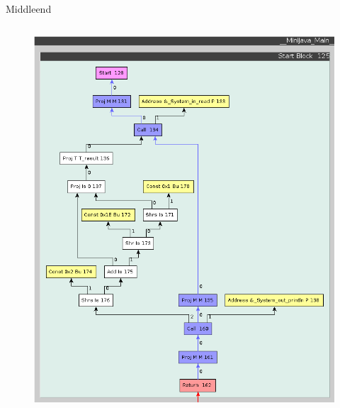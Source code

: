 \documentclass[en,16:9]{sdqbeamer}
\begin{document}
\begin{frame}{Middleend}
\begin{columns}
		\begin{column}{0.3\linewidth}
			\begin{figure}
				\centering
				\includegraphics[scale=0.2]{images/optimization-after.png}
			\end{figure}
		\end{column}
	\end{columns}
\end{frame}
\end{document}
